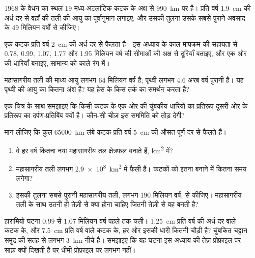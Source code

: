 \begin{exercise}[$\star\star$]\label{exo:g11:drift-to-spreading:8}
1968 के वेधन का स्थल 19 मध्य-अटलांटिक कटक के अक्ष से \qty{990}{km} पर
है। प्रति वर्ष \qty{1.9}{cm} की अर्ध दर से वहाँ की तली की आयु का पूर्वानुमान
लगाइए, और उसकी तुलना उसके सबसे पुराने अवसाद के \num{49} मिलियन वर्षों से
कीजिए।
\end{exercise}

\begin{exercise}[$\star\star$]\label{exo:g11:drift-to-spreading:9}
एक कटक प्रति वर्ष \qty{2}{cm} की अर्ध दर से फैलता है। इस अध्याय के काल-मापक्रम की
सहायता से 0.78,
0.99, 1.07, 1.77 और 1.95 मिलियन वर्ष की सीमाओं की अक्ष से दूरियाँ बताइए, और एक ओर की धारियाँ बनाइए,
सामान्य को काले रंग में।
\end{exercise}

\begin{exercise}[$\star\star$]\label{exo:g11:drift-to-spreading:10}
महासागरीय तली की माध्य आयु लगभग \num{64} मिलियन वर्ष है; पृथ्वी
लगभग \num{4.6} अरब वर्ष पुरानी है। यह पृथ्वी की आयु का कितना अंश है?
यह हेस के किस तर्क का समर्थन करता है?
\end{exercise}

\begin{exercise}[$\star\star$]\label{exo:g11:drift-to-spreading:11}
एक चित्र के साथ समझाइए कि किसी कटक के एक ओर की चुंबकीय धारियों का प्रतिरूप
दूसरी ओर के प्रतिरूप का दर्पण-प्रतिबिंब क्यों है। कौन-सी चीज़
इस सममिति को तोड़ देगी?
\end{exercise}

\begin{exercise}[$\star\star\star$]\label{exo:g11:drift-to-spreading:12}
मान लीजिए कि कुल \qty{65000}{km} लंबे कटक प्रति वर्ष \qty{5}{cm} की औसत पूर्ण दर से
फैलते हैं।
\begin{enumerate}
  \item वे हर वर्ष कितना नया महासागरीय तल क्षेत्रफल बनाते हैं, \unit{km^2} में?
  \item महासागरीय तली लगभग \qty{2.9e8}{km^2} में फैली है। कटकों को
        इतना बनाने में कितना समय लगेगा?
  \item इसकी तुलना सबसे पुरानी महासागरीय तली, लगभग \num{190} मिलियन वर्ष, से कीजिए।
        महासागरीय तली के साथ उतनी ही तेज़ी से क्या होना चाहिए जितनी तेज़ी से वह बनती है?
\end{enumerate}
\end{exercise}

\begin{exercise}[$\star\star\star$]\label{exo:g11:drift-to-spreading:13}
हारामियो घटना \num{0.99} से \num{1.07} मिलियन वर्ष पहले तक चली।
\qty{1.25}{cm} प्रति वर्ष की अर्ध दर वाले कटक के, और \qty{7.5}{cm} प्रति वर्ष वाले कटक के, हर ओर
इसकी धारी कितनी चौड़ी है? चुंबकित
चट्टान समुद्र की सतह से लगभग \qty{3}{km} नीचे है। समझाइए कि यह घटना
इस अध्याय की तेज़ प्रोफ़ाइल पर साफ़ क्यों दिखती है पर धीमी प्रोफ़ाइल पर लगभग नहीं।
\end{exercise}

